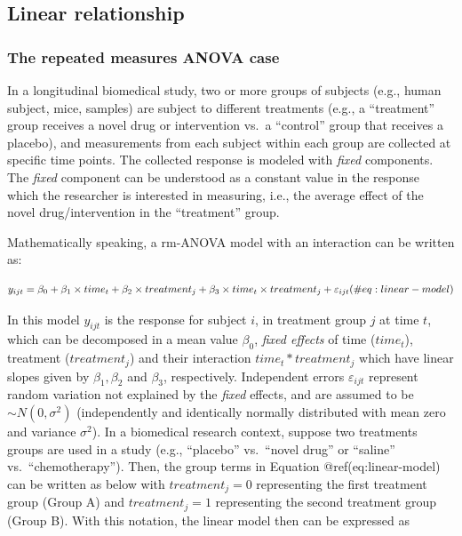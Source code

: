 \documentclass[Royal,times,sagev]{sagej}
\begin{document}
\hypertarget{linear-relationship}{%
\subsection{Linear relationship}\label{linear-relationship}}

\hypertarget{the-repeated-measures-anova-case}{%
\subsubsection{The repeated measures ANOVA
case}\label{the-repeated-measures-anova-case}}

In a longitudinal biomedical study, two or more groups of subjects
(e.g., human subject, mice, samples) are subject to different treatments
(e.g., a ``treatment'' group receives a novel drug or intervention vs.~a
``control'' group that receives a placebo), and measurements from each
subject within each group are collected at specific time points. The
collected response is modeled with \emph{fixed} components. The
\emph{fixed} component can be understood as a constant value in the
response which the researcher is interested in measuring, i.e., the
average effect of the novel drug/intervention in the ``treatment''
group.

Mathematically speaking, a rm-ANOVA model with an interaction can be
written as:

\begin{equation}
y_{ijt} = \beta_0+\beta_1 \times time_{t} +\beta_2 \times treatment_{j} +\beta_3 \times time_{t}\times treatment_{j}+\varepsilon_{ijt}\\ 
(\#eq:linear-model)
\end{equation}

In this model \(y_{ijt}\) is the response for subject \(i\), in
treatment group \(j\) at time \(t\), which can be decomposed in a mean
value \(\beta_0\), \emph{fixed effects} of time (\(time_t\)), treatment
(\(treatment_j\)) and their interaction \(time_t*treatment_j\) which
have linear slopes given by \(\beta_1, \beta_2\) and \(\beta_3\),
respectively. Independent errors \(\varepsilon_{ijt}\) represent random
variation not explained by the \emph{fixed} effects, and are assumed to
be \(\sim N(0,\sigma^2)\) (independently and identically normally
distributed with mean zero and variance \(\sigma^2\)). In a biomedical
research context, suppose two treatments groups are used in a study
(e.g., ``placebo'' vs.~``novel drug'' or ``saline''
vs.~``chemotherapy''). Then, the group terms in Equation
@ref(eq:linear-model) can be written as below with \(treatment_j=0\)
representing the first treatment group (Group A) and \(treatment_j=1\)
representing the second treatment group (Group B). With this notation,
the linear model then can be expressed as
\end{document}
